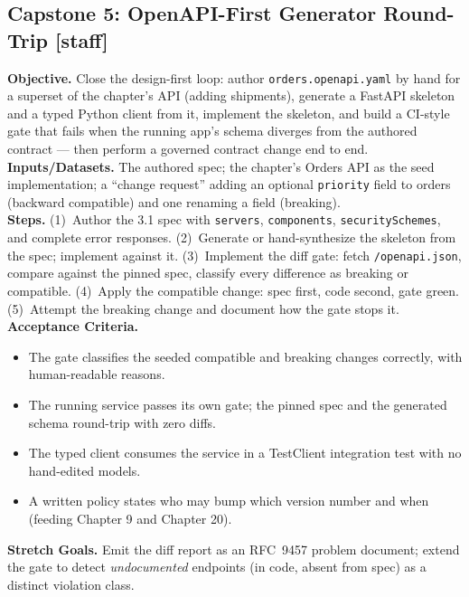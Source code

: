 \subsection{Capstone 5: OpenAPI-First Generator Round-Trip [staff]}
\textbf{Objective.} Close the design-first loop: author
\texttt{orders.openapi.yaml} by hand for a superset of the chapter's API
(adding shipments), generate a FastAPI skeleton and a typed Python client
from it, implement the skeleton, and build a CI-style gate that fails when
the running app's schema diverges from the authored contract --- then perform
a governed contract change end to end.\\
\textbf{Inputs/Datasets.} The authored spec; the chapter's Orders API as the
seed implementation; a ``change request'' adding an optional
\texttt{priority} field to orders (backward compatible) and one renaming a
field (breaking).\\
\textbf{Steps.} (1)~Author the 3.1 spec with \texttt{servers},
\texttt{components}, \texttt{securitySchemes}, and complete error responses.
(2)~Generate or hand-synthesize the skeleton from the spec; implement against
it. (3)~Implement the diff gate: fetch \texttt{/openapi.json}, compare
against the pinned spec, classify every difference as breaking or
compatible. (4)~Apply the compatible change: spec first, code second, gate
green. (5)~Attempt the breaking change and document how the gate stops it.\\
\textbf{Acceptance Criteria.}
\begin{itemize}
  \item[$\square$] The gate classifies the seeded compatible and breaking
        changes correctly, with human-readable reasons.
  \item[$\square$] The running service passes its own gate; the pinned spec
        and the generated schema round-trip with zero diffs.
  \item[$\square$] The typed client consumes the service in a TestClient
        integration test with no hand-edited models.
  \item[$\square$] A written policy states who may bump which version number
        and when (feeding Chapter 9 and Chapter 20).
\end{itemize}
\textbf{Stretch Goals.} Emit the diff report as an RFC~9457 problem document;
extend the gate to detect \emph{undocumented} endpoints (in code, absent
from spec) as a distinct violation class.

